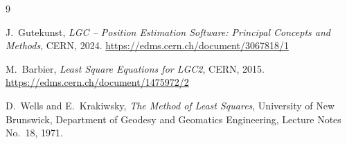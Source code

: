 \documentclass[a4paper,11pt]{article}
\newcommand{\code}[1]{\texttt{#1}}
\begin{document}


\begin{thebibliography}{9}

    J.~Gutekunst,
    \emph{LGC -- Position Estimation Software: Principal Concepts and Methods},
    CERN, 2024.
    \url{https://edms.cern.ch/document/3067818/1}

    M.~Barbier,
    \emph{Least Square Equations for LGC2},
    CERN, 2015.
    \url{https://edms.cern.ch/document/1475972/2}

    D.~Wells and E.~Krakiwsky,
    \emph{The Method of Least Squares},
    University of New Brunswick, Department of Geodesy and Geomatics
    Engineering, Lecture Notes No.~18, 1971.

\end{thebibliography}
\end{document}

